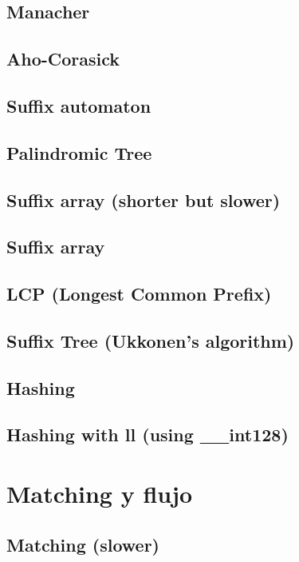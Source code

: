 \subsection{Manacher}
\subsection{Aho-Corasick}
\subsection{Suffix automaton}
\subsection{Palindromic Tree}
\subsection{Suffix array (shorter but slower)}
\subsection{Suffix array}
\subsection{LCP (Longest Common Prefix)}
\subsection{Suffix Tree (Ukkonen's algorithm)}
\subsection{Hashing}
\subsection{Hashing with ll (using \_\_int128)}

\section{Matching y flujo}
\subsection{Matching (slower)}

